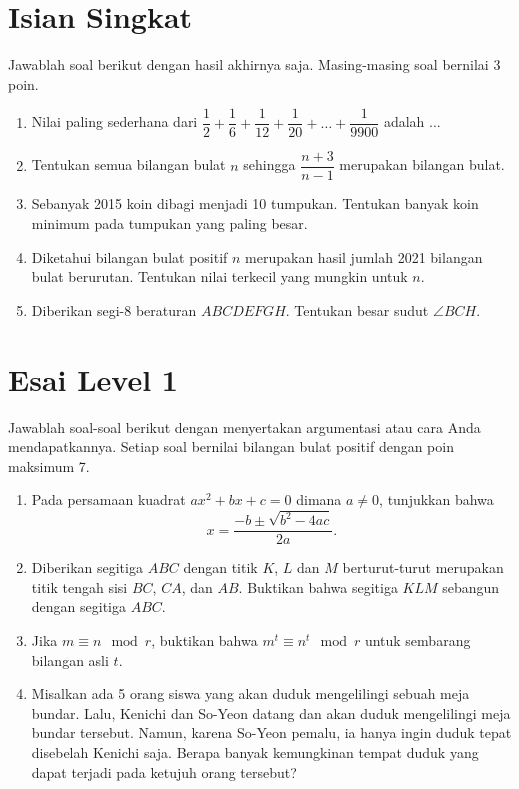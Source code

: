 \documentclass{article}
\begin{document}
\section{Isian Singkat}
Jawablah soal berikut dengan hasil akhirnya saja. Masing-masing soal bernilai 3 poin.
\begin{enumerate}[resume]
	\item Nilai paling sederhana dari $\dfrac{1}{2}+\dfrac{1}{6}+\dfrac{1}{12}+\dfrac{1}{20}+\dots +\dfrac{1}{9900}$ adalah ...
	
	\item Tentukan semua bilangan bulat $n$ sehingga $\dfrac{n+3}{n-1}$ merupakan bilangan bulat.
	
	\item Sebanyak 2015 koin dibagi menjadi 10 tumpukan. Tentukan banyak koin minimum pada tumpukan yang paling besar.
	
	\item Diketahui bilangan bulat positif $n$ merupakan hasil jumlah 2021 bilangan bulat berurutan. Tentukan nilai terkecil yang mungkin untuk $n$.
	
	\item Diberikan segi-8 beraturan $ABCDEFGH$. Tentukan besar sudut $\angle BCH$.
\end{enumerate}

\section{Esai Level 1}
Jawablah soal-soal berikut dengan menyertakan argumentasi atau cara Anda mendapatkannya. Setiap soal bernilai bilangan bulat positif dengan poin maksimum 7.

\begin{enumerate}[resume]
	\item Pada persamaan kuadrat $ax^2+bx+c=0$ dimana $a \neq 0$, tunjukkan bahwa $$x = \frac{-b \pm \sqrt{b^2-4ac}}{2a}.$$
	
	\item Diberikan segitiga $ABC$ dengan titik $K$, $L$ dan $M$ berturut-turut merupakan titik tengah sisi $BC$, $CA$, dan $AB$. Buktikan bahwa segitiga $KLM$ sebangun dengan segitiga $ABC$.
	
	\item Jika $m \equiv n \mod r$, buktikan bahwa $m^t \equiv n^t \mod r$ untuk sembarang bilangan asli $t$.
	
	\item Misalkan ada 5 orang siswa yang akan duduk mengelilingi sebuah meja bundar. Lalu, Kenichi dan So-Yeon datang dan akan duduk mengelilingi meja bundar tersebut. Namun, karena So-Yeon pemalu, ia hanya ingin duduk tepat disebelah Kenichi saja. Berapa banyak kemungkinan tempat duduk yang dapat terjadi pada ketujuh orang tersebut?
	
\end{enumerate}
\end{document}
